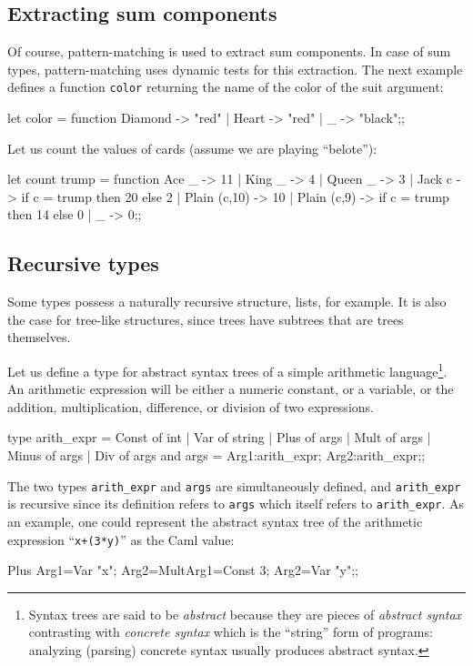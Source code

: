 \subsection{Extracting sum components}

Of course, pattern-matching is used to extract sum components.
In case of sum types, pattern-matching uses dynamic tests for this
extraction.
The next example defines a function {\tt color} returning the name of
the color of the suit argument:%
\begin{caml_example}
let color = function Diamond -> "red"
                   | Heart -> "red"
                   | _ -> "black";;
\end{caml_example}
Let us count the values of cards (assume we are playing ``belote''):
\begin{caml_example}
let count trump = function
    Ace _        -> 11
  | King _       -> 4
  | Queen _      -> 3
  | Jack c       -> if c = trump then 20 else 2
  | Plain (c,10) -> 10
  | Plain (c,9)  -> if c = trump then 14 else 0
  | _             -> 0;;
\end{caml_example}

\subsection{Recursive types}

Some types possess a naturally recursive structure, lists, for
example. It is also the case for tree-like structures, since trees
have subtrees that are trees themselves.

Let us define a type for abstract syntax trees of a simple arithmetic
language\footnote{Syntax trees are said to be {\em abstract} because
they are pieces of {\em abstract syntax} contrasting with {\em
concrete syntax} which is the ``string'' form of programs: analyzing
(parsing) concrete syntax usually produces abstract syntax.}. An
arithmetic expression will be either a numeric constant, or a
variable, or the addition, multiplication, difference, or division of
two expressions.
\begin{caml_example}
type arith_expr = Const of int
                | Var of string
                | Plus of args
                | Mult of args
                | Minus of args
                | Div of args
and args = {Arg1:arith_expr; Arg2:arith_expr};;
\end{caml_example}
The two types \verb|arith_expr| and \verb|args| are simultaneously
defined, and \verb|arith_expr| is recursive since its definition
refers to \verb|args| which itself refers to \verb|arith_expr|. As an
example, one could represent the abstract syntax tree of the
arithmetic expression ``\verb|x+(3*y)|'' as the Caml value:
\begin{caml_example}
Plus {Arg1=Var "x";
       Arg2=Mult{Arg1=Const 3; Arg2=Var "y"}};;
\end{caml_example}

